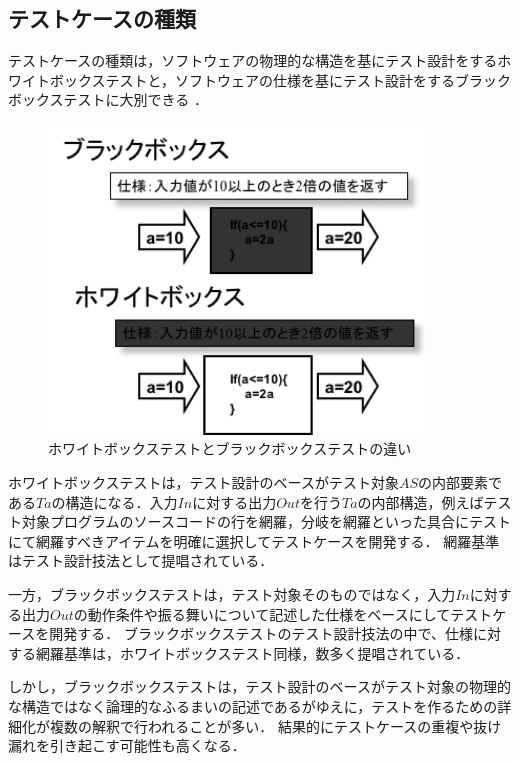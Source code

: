 \subsection{テストケースの種類}
テストケースの種類は，ソフトウェアの物理的な構造を基にテスト設計をするホワイトボックステストと，ソフトウェアの仕様を基にテスト設計をするブラックボックステストに大別できる\cite{myers2011art} ．

\begin{figure}[htbp]
  \begin{center}
  \includegraphics[width=10cm]{./image/BlackboxWhitebox.png}
  \caption{ホワイトボックステストとブラックボックステストの違い}
  \label{fig:D-2-Fig0}
  \end{center}
\end{figure}

ホワイトボックステストは，テスト設計のベースがテスト対象$AS$の内部要素である$Ta$の構造になる．入力$In$に対する出力$Out$を行う$Ta$の内部構造，例えばテスト対象プログラムのソースコードの行を網羅，分岐を網羅といった具合にテストにて網羅すべきアイテムを明確に選択してテストケースを開発する．
網羅基準はテスト設計技法として提唱されている\cite{myers2011art,beiz90}．

一方，ブラックボックステストは，テスト対象そのものではなく，入力$In$に対する出力$Out$の動作条件や振る舞いについて記述した仕様をベースにしてテストケースを開発する．
ブラックボックステストのテスト設計技法の中で、仕様に対する網羅基準は，ホワイトボックステスト同様，数多く提唱されている．

しかし，ブラックボックステストは，テスト設計のベースがテスト対象の物理的な構造ではなく論理的なふるまいの記述であるがゆえに，テストを作るための詳細化が複数の解釈で行われることが多い．
結果的にテストケースの重複や抜け漏れを引き起こす可能性も高くなる．

